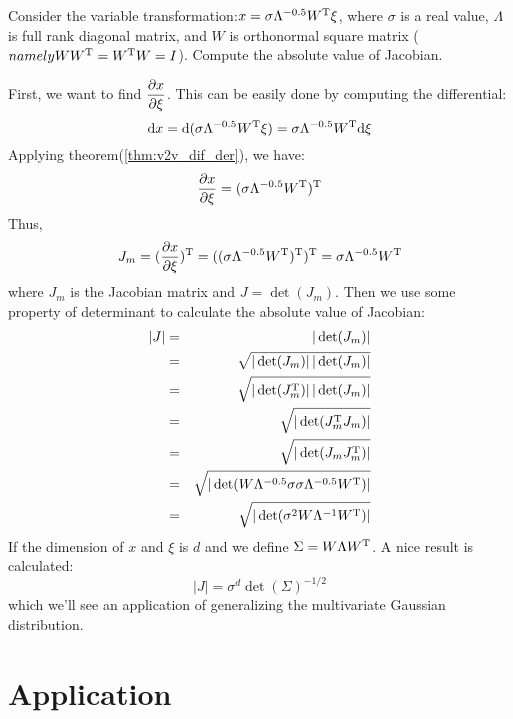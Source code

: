 \begin{myex}
	\label{ex:gaussian_trans}
	Consider the variable transformation:$x = \sigma \Lambda^{-0.5}W^\mathrm{T} \xi$, 
	where $\sigma$ is a real value, $\Lambda$ is full rank diagonal matrix, 
	and $W$ is orthonormal square matrix
	($namely WW^\mathrm{T}=W^\mathrm{T}W = I$). Compute
	the absolute value of Jacobian.  
	
	First, we want to find $\dfrac{\partial x}{\partial \xi}$. This can be easily done 
	by computing the differential:
	\begin{equation}
		\mathrm{d}x = \mathrm{d}(\sigma \Lambda^{-0.5}W^\mathrm{T} \xi) 
		= \sigma \Lambda^{-0.5}W^\mathrm{T} \mathrm{d}\xi
	\end{equation}
	Applying theorem(\ref{thm:v2v_dif_der}), we have:
	\begin{equation}
		\dfrac{\partial x}{\partial \xi} = (\sigma \Lambda^{-0.5}W^\mathrm{T}) ^\mathrm{T}
	\end{equation}
	Thus, 
	\begin{equation}
		J_m = (\dfrac{\partial x}{\partial \xi}) ^\mathrm{T} = ((\sigma \Lambda^{-0.5}W^\mathrm{T}) ^\mathrm{T})^\mathrm{T}
		=\sigma \Lambda^{-0.5}W^\mathrm{T}
	\end{equation}
	where $J_m$ is the Jacobian matrix and $J= \det(J_m)$. Then we use 
	some property of determinant to calculate the absolute value of 
	Jacobian:
	\begin{eqnarray}
		|J| &=& |\det(J_m)| \\
		&=& \sqrt{|\det(J_m)|\,|\det(J_m)|} \\
		&=& \sqrt{|\det(J_m^\mathrm{T})|\,|\det(J_m)|} \\
		&=& \sqrt{|\det(J_m^\mathrm{T}J_m)|} \\
		&=& \sqrt{|\det(J_mJ_m^\mathrm{T})|} \\
		&=& \sqrt{|\det(   W \Lambda^{-0.5}\sigma \sigma \Lambda^{-0.5}W^\mathrm{T}  )|} \\
		&=& \sqrt{|\det( \sigma^2  W \Lambda^{-1}W^\mathrm{T}  )|}
	\end{eqnarray}
	If the dimension of $x$ and $\xi$ is $d$ and we define $\Sigma = W \Lambda W^\mathrm{T}$. 
	A nice result is calculated:
	\begin{equation}
		|J| = \sigma^d \det(\Sigma)^{-1/2}
	\end{equation}
	which we'll see an application of generalizing the multivariate Gaussian distribution. 
\end{myex}

\section{Application}
\label{sec:application}

